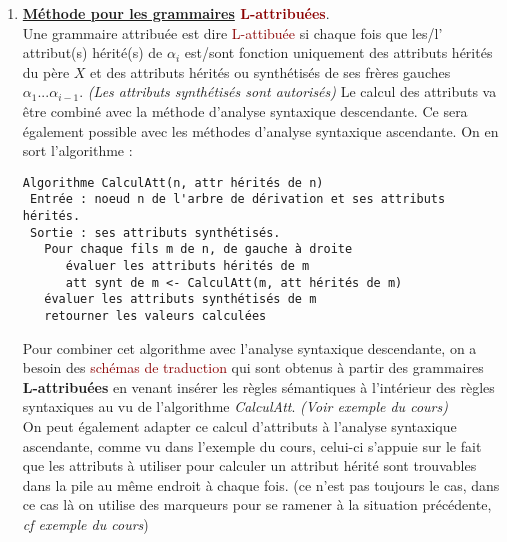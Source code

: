 \documentclass{article}
\newcommand{\red}[1]{\textcolor{darkred}{#1}}
\begin{document}
\begin{enumerate}
\item \textbf{\underline{Méthode pour les grammaires} \red{L-attribuées}}. \\
Une grammaire attribuée est dire \red{L-attibuée} si chaque fois que les/l' attribut(s) hérité(s) de $\alpha_i$ est/sont fonction uniquement des attributs hérités du père $X$ et 
des attributs hérités ou synthétisés de ses frères gauches $\alpha_1...\alpha_{i-1}$. \textit{(Les attributs synthétisés sont autorisés)} Le calcul des attributs va être combiné avec 
la méthode d'analyse syntaxique descendante. Ce sera également possible avec les méthodes d'analyse syntaxique ascendante. On en sort l'algorithme :
\begin{verbatim}
Algorithme CalculAtt(n, attr hérités de n)
 Entrée : noeud n de l'arbre de dérivation et ses attributs hérités.
 Sortie : ses attributs synthétisés.
   Pour chaque fils m de n, de gauche à droite
      évaluer les attributs hérités de m
      att synt de m <- CalculAtt(m, att hérités de m)
   évaluer les attributs synthétisés de m
   retourner les valeurs calculées
\end{verbatim}
Pour combiner cet algorithme avec l'analyse syntaxique descendante, on a besoin des \red{schémas de traduction} qui sont obtenus à partir des grammaires \textbf{L-attribuées} 
en venant insérer les règles sémantiques à l'intérieur des règles syntaxiques au vu de l'algorithme \textit{CalculAtt}. \textit{(Voir exemple du cours)} \\

On peut également adapter ce calcul d'attributs à l'analyse syntaxique ascendante, comme vu dans l'exemple du cours, celui-ci s'appuie sur le fait que les attributs à utiliser pour 
calculer un attribut hérité sont trouvables dans la pile au même endroit à chaque fois. (ce n'est pas toujours le cas, dans ce cas là on utilise des marqueurs pour se ramener à la 
situation précédente, \textit{cf exemple du cours})
\end{enumerate}
\end{document}
